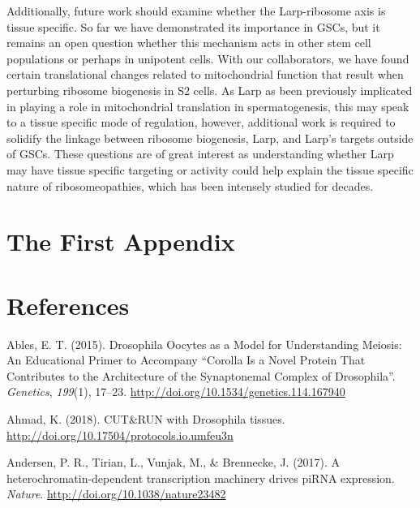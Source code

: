 \documentclass[12pt,oneside]{reedthesis}
\begin{document}
Additionally, future work should examine whether the Larp-ribosome axis is tissue specific. So far we have demonstrated its importance in GSCs, but it remains an open question whether this mechanism acts in other stem cell populations or perhaps in unipotent cells. With our collaborators, we have found certain translational changes related to mitochondrial function that result when perturbing ribosome biogenesis in S2 cells. As Larp as been previously implicated in playing a role in mitochondrial translation in spermatogenesis, this may speak to a tissue specific mode of regulation, however, additional work is required to solidify the linkage between ribosome biogenesis, Larp, and Larp's targets outside of GSCs. These questions are of great interest as understanding whether Larp may have tissue specific targeting or activity could help explain the tissue specific nature of ribosomeopathies, which has been intensely studied for decades.

\appendix

\hypertarget{the-first-appendix}{%
\chapter{The First Appendix}\label{the-first-appendix}}

\backmatter

\hypertarget{references}{%
\chapter*{References}\label{references}}


\noindent

\setlength{\parindent}{-0.20in}
\setlength{\leftskip}{0.20in}
\setlength{\parskip}{8pt}

\hypertarget{refs}{}
\leavevmode\hypertarget{ref-ablesDrosophilaOocytesModel2015}{}%
Ables, E. T. (2015). Drosophila Oocytes as a Model for Understanding Meiosis: An Educational Primer to Accompany ``Corolla Is a Novel Protein That Contributes to the Architecture of the Synaptonemal Complex of Drosophila''. \emph{Genetics}, \emph{199}(1), 17--23. \url{http://doi.org/10.1534/genetics.114.167940}

\leavevmode\hypertarget{ref-ahmadCUTRUNDrosophila2018}{}%
Ahmad, K. (2018). CUT\&RUN with Drosophila tissues. \url{http://doi.org/10.17504/protocols.io.umfeu3n}

\leavevmode\hypertarget{ref-andersenHeterochromatindependentTranscriptionMachinery2017}{}%
Andersen, P. R., Tirian, L., Vunjak, M., \& Brennecke, J. (2017). A heterochromatin-dependent transcription machinery drives piRNA expression. \emph{Nature}. \url{http://doi.org/10.1038/nature23482}
\end{document}
